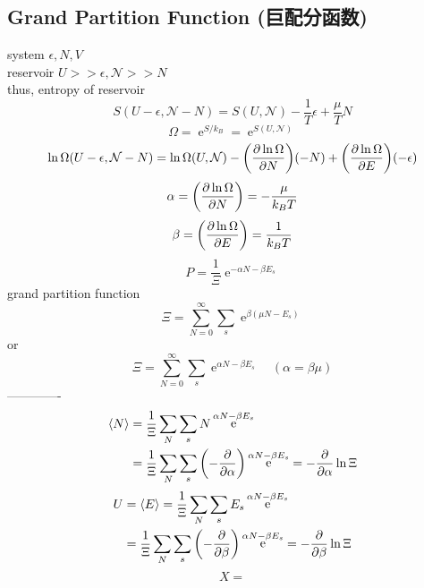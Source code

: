 \documentclass[UTF8]{ctexart} %
\DeclareMathOperator{\e}{\mathrm{e}}
\numberwithin{equation}{subsection}
\begin{document}
\subsection{Grand Partition Function (巨配分函数)}
system $\epsilon, N, V$\\
reservoir $U >> \epsilon, \mathcal{N} >> N$\\
thus, entropy of reservoir
\begin{equation}\label{key}
S(U-\epsilon,\mathcal{N}-N) = S(U,\mathcal{N}) - \dfrac{1}{T}\epsilon + \dfrac{\mu}{T}N
\end{equation}
\begin{equation}\label{key}
\Omega = \e^{S/k_B} = \e^{S(U,\mathcal{N})}
\end{equation}
\begin{equation}\label{key}
\ln\Omega(U-\epsilon,\mathcal{N}-N) = \ln\Omega(U,\mathcal{N}) - \qty(\pdv{\ln\Omega}{N})(-N) + \qty(\pdv{\ln\Omega}{E})(-\epsilon)
\end{equation}
\begin{equation}\label{key}
\alpha = \qty(\pdv{\ln\Omega}{N}) = -\dfrac{\mu}{k_B T}
\end{equation}
\begin{equation}\label{key}
\beta = \qty(\pdv{\ln\Omega}{E}) = \dfrac{1}{k_B T}
\end{equation}
\begin{equation}\label{key}
P = \dfrac{1}{\Xi}\e^{-\alpha N - \beta E_s}
\end{equation}
grand partition function
\begin{equation}\label{key}
\Xi = 
\sum_{N=0}^\infty \sum_s \e^{\beta(\mu N - E_s)}
\end{equation}
or
\begin{equation}\label{key}
\Xi = \sum_{N=0}^\infty \sum_s \e^{\alpha N - \beta E_s}  \quad(\alpha = \beta\mu)
\end{equation}
-------------~\\
\begin{equation}\label{key}
\begin{aligned}
\langle N\rangle &= \dfrac{1}{\Xi}\sum_N\sum_s N \e^{\alpha N - \beta E_s}\\
&= \dfrac{1}{\Xi}\sum_N\sum_s \qty(-\pdv{\alpha}) \e^{\alpha N - \beta E_s} = -\pdv{\alpha}\ln\Xi
\end{aligned}
\end{equation}
\begin{equation}\label{key}
\begin{aligned}
U &= \langle E\rangle = \dfrac{1}{\Xi}\sum_N\sum_s E_s \e^{\alpha N - \beta E_s}\\
&= \dfrac{1}{\Xi}\sum_N\sum_s \qty(-\pdv{\beta}) \e^{\alpha N - \beta E_s} = -\pdv{\beta}\ln\Xi
\end{aligned}
\end{equation}
\begin{equation}\label{key}
X = 
\end{equation}
\end{document}
